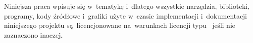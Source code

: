 \documentclass[thesis]{subfiles}
\begin{document}
Niniejsza praca wpisuje się w~tematykę  i~dlatego wszystkie narzędzia, biblioteki, programy, kody źródłowe i~grafiki użyte w~czasie implementacji i~dokumentacji niniejszego projektu są~licencjonowane na~warunkach licencji typu~ jeśli nie zaznaczono inaczej.

%
\end{document}
